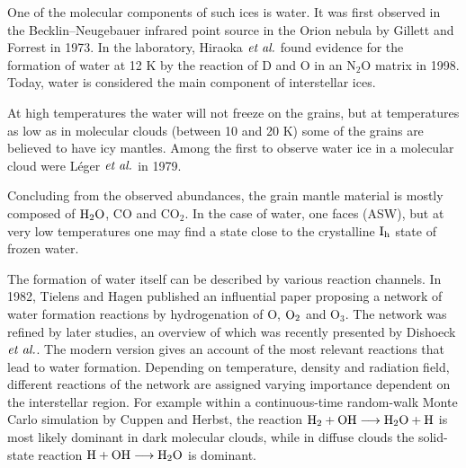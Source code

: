One of the molecular components of such ices is water. It was first observed
in the Becklin--Neugebauer infrared point source in the Orion
nebula by Gillett and Forrest in 1973.
\cite{BecklinNeugebauer1967,GillettForrest1973} In the laboratory, Hiraoka
$\emph{et al.}$ found evidence for the formation of water at 12 K by the reaction of D and O in an N$_2$O
matrix in 1998.\cite{Hiraoka1998} Today, water is considered the main component
of interstellar ices. \cite{BoogertGerakinesWhittet2015} 


At high temperatures the water will not freeze on the grains, but at
temperatures as low as in molecular clouds (between 10 and 20
K)\cite{Ferriere2001} some of the grains are believed to have icy mantles.
Among the first to observe water ice in a molecular cloud were Léger $\emph{et al.}$ in
1979.\cite{Leger1979}

Concluding from the observed abundances, the grain mantle material is mostly
composed of $\text H _2 \text O$, CO and CO$_2$.
In the case of water, one faces  (ASW), but at very
low temperatures one may find a state close to the crystalline $\text I_\text h$ state of
frozen water.  

The formation of water itself can be described by various reaction channels. In
1982, Tielens and Hagen published an influential paper
proposing a network of water formation reactions by hydrogenation of O, $\text O_2$
and O$_3$.\cite{TielensHagen1982} The network was refined by later studies, an
overview of which was recently presented by Dishoeck $\emph{et al.}$.
\cite{DishoeckHerbstNeufeld2013}
The modern version gives an account of the most relevant reactions that lead to
water formation. Depending on temperature, density and radiation field,
different reactions of the network are assigned varying importance dependent on the
interstellar region. For example within a continuous-time random-walk Monte
Carlo simulation by Cuppen and Herbst, the reaction
\mbox{$\text H_2+\text O \text H\longrightarrow\text H _2 \text O+\text H$} is most likely dominant in dark molecular
clouds, while in diffuse clouds the solid-state reaction \mbox{$\text
H+\text O \text H\longrightarrow\text H _2 \text O$} is dominant. \cite{CuppenHerbst2007}

